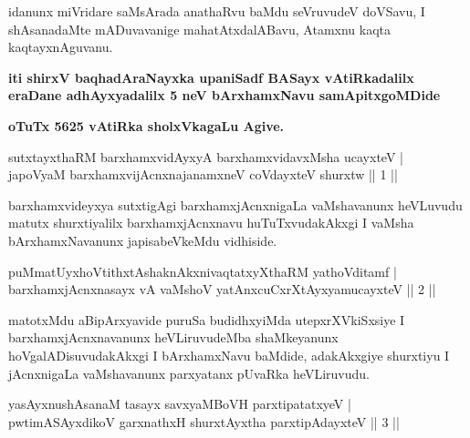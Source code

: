 \begin{artha}
idanunx miVridare saMsArada anathaRvu baMdu seVruvudeV doVSavu, I shAsanadaMte mADuvavanige mahatAtxdalABavu, Atamxnu kaqta kaqtayxnAguvanu.
\end{artha}

\begin{center}
\textbf{iti shirxV baqhadAraNayxka upaniSadf BASayx vAtiRkadalilx eraDane
adhAyxyadalilx 5 neV bArxhamxNavu samApitxgoMDide}

\medskip
\textbf{oTuTx 5625 vAtiRka sholxVkagaLu Agive.}
\end{center}


\centerline{}

\begin{shl}
sutxtayxthaRM barxhamxvidAyxyA barxhamxvidavxMsha ucayxteV |\\
japoV\s yaM barxhamxvijAcnxnajanamxneV coVdayxteV shurxtw \hfill || 1 ||
\end{shl}

\begin{artha}
barxhamxvideyxya sutxtigAgi barxhamxjAcnxnigaLa vaMshavanunx heVLuvudu matutx shurxtiyalilx barxhamxjAcnxnavu huTuTxvudakAkxgi I vaMsha bArxhamxNavanunx japisabeVkeMdu vidhiside.
\end{artha}

\begin{shl}
puMmatUyxhoVtithxtAshaknAkxnivaqtatxyXthaRM yathoVditamf |\\
barxhamxjAcnxnasayx vA vaMshoV yatAnxcuCxrXtAyx\s yamucayxteV \hfill || 2 ||
\end{shl}

\begin{artha}
matotxMdu aBipArxyavide puruSa budidhxyiMda utepxrXVkiSxsiye I barxhamxjAcnxnavanunx heVLiruvudeMba shaMkeyanunx hoVgalADisuvudakAkxgi I bArxhamxNavu baMdide, adakAkxgiye shurxtiyu I jAcnxnigaLa vaMshavanunx parxyatanx pUvaRka heVLiruvudu.
\end{artha}


\begin{shl}
yasAyxnushAsanaM tasayx savxyaMBoVH parxtipatatxyeV |\\
pwtimASAyxdikoV garxnathxH shurxtAyx\s tha parxtipAdayxteV \hfill || 3 ||
\end{shl}

